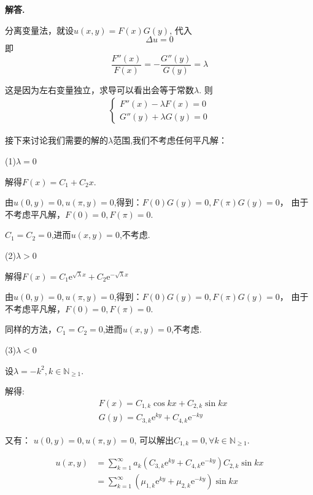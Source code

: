 \documentclass[12pt, a4paper, oneside]{ctexart}
\newenvironment{solution}{\par\noindent\textbf{解答. }}{\par}
\begin{document}
\begin{solution}
\par
分离变量法，就设$u(x,y)=F(x)G(y)$,
代入$$
\Delta u=0
$$
即$$
\dfrac{F''(x)}{F(x)}=-\dfrac{G''(y)}{G(y)}=\lambda
$$
\par
这是因为左右变量独立，求导可以看出会等于常数$\lambda$.
则
$$
\begin{aligned}
  \begin{cases}
    F''(x)-\lambda F(x)=0\\
    G''(y)+\lambda G(y)=0
  \end{cases}
\end{aligned}
$$
\par
接下来讨论我们需要的解的$\lambda$范围,我们不考虑任何平凡解：
\par
\quad
\par
(1)$\lambda =0 $
\par
解得$F(x)=C_1+C_2x$.
\par
由$u(0,y)=0, u(\pi,y)=0$,得到：$F(0)G(y)=0, F(\pi)G(y)=0$，
由于不考虑平凡解，$F(0)=0, F(\pi)=0$.
\par
$C_1=C_2=0$,进而$u(x,y)=0$,不考虑.
\par
\quad
\par
(2)$\lambda>0$
\par
解得$F(x)=C_1\mathrm{e}^{\sqrt{\lambda}x}+C_2\mathrm{e}^{-\sqrt{\lambda}x}$
\par
由$u(0,y)=0, u(\pi,y)=0$,得到：$F(0)G(y)=0, F(\pi)G(y)=0$，
由于不考虑平凡解，$F(0)=0, F(\pi)=0$.
\par
同样的方法，$C_1=C_2=0$,进而$u(x,y)=0$,不考虑.
\par
\quad
\par
(3)$\lambda<0$
\par
设$\lambda=-k^2, k\in \mathbb{N}_{\geqslant 1}$.
\par
解得:$$
\begin{aligned}
&F(x)=C_{1,k}\cos kx +C_{2,k} \sin kx\\
&G(y)=C_{3,k}\mathrm{e}^{ky}+C_{4,k}\mathrm{e}^{-ky}
\end{aligned}
$$
\par
又有：
$u(0,y)=0, u(\pi,y)=0$,
可以解出$C_{1,k}=0, \forall k \in \mathbb{N}_{\geqslant 1}$.
\par
$$
\begin{aligned}
u(x,y)&=\sum_{k=1}^{\infty}a_k\left(C_{3,k}\mathrm{e}^{ky}+C_{4,k}\mathrm{e}^{-ky}\right)C_{2,k}\sin kx\\
&=\sum_{k=1}^{\infty}\left(\mu_{1,k}\mathrm{e}^{ky}+\mu_{2,k}\mathrm{e}^{-ky}\right)\sin kx\\

\end{aligned}$$
\end{solution}
\end{document}
